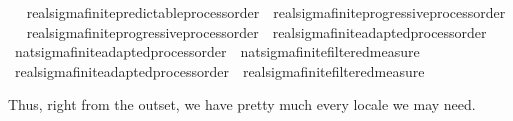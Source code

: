 \begin{isabellebody}
%
\endisatagproof
{\isafoldproof}%
%
\isadelimproof
%
\endisadelimproof
\ \isanewline
\isanewline
{}\isamarkupfalse%
\ real{\isacharunderscore}{\kern0pt}sigma{\isacharunderscore}{\kern0pt}finite{\isacharunderscore}{\kern0pt}predictable{\isacharunderscore}{\kern0pt}process{\isacharunderscore}{\kern0pt}order\ {\isasymsubseteq}\ real{\isacharunderscore}{\kern0pt}sigma{\isacharunderscore}{\kern0pt}finite{\isacharunderscore}{\kern0pt}progressive{\isacharunderscore}{\kern0pt}process{\isacharunderscore}{\kern0pt}order%
\isadelimproof
\ %
\endisadelimproof
%
\isatagproof
\isacommand{{\isachardot}{\kern0pt}{\isachardot}{\kern0pt}}\isamarkupfalse%
%
\endisatagproof
{\isafoldproof}%
%
\isadelimproof
%
\endisadelimproof
\isanewline
{}\isamarkupfalse%
\ real{\isacharunderscore}{\kern0pt}sigma{\isacharunderscore}{\kern0pt}finite{\isacharunderscore}{\kern0pt}progressive{\isacharunderscore}{\kern0pt}process{\isacharunderscore}{\kern0pt}order\ {\isasymsubseteq}\ real{\isacharunderscore}{\kern0pt}sigma{\isacharunderscore}{\kern0pt}finite{\isacharunderscore}{\kern0pt}adapted{\isacharunderscore}{\kern0pt}process{\isacharunderscore}{\kern0pt}order%
\isadelimproof
\ %
\endisadelimproof
%
\isatagproof
\isacommand{{\isachardot}{\kern0pt}{\isachardot}{\kern0pt}}\isamarkupfalse%
%
\endisatagproof
{\isafoldproof}%
%
\isadelimproof
%
\endisadelimproof
\isanewline
\isanewline
{}\isamarkupfalse%
\ nat{\isacharunderscore}{\kern0pt}sigma{\isacharunderscore}{\kern0pt}finite{\isacharunderscore}{\kern0pt}adapted{\isacharunderscore}{\kern0pt}process{\isacharunderscore}{\kern0pt}order\ {\isasymsubseteq}\ nat{\isacharunderscore}{\kern0pt}sigma{\isacharunderscore}{\kern0pt}finite{\isacharunderscore}{\kern0pt}filtered{\isacharunderscore}{\kern0pt}measure%
\isadelimproof
\ %
\endisadelimproof
%
\isatagproof
\isacommand{{\isachardot}{\kern0pt}{\isachardot}{\kern0pt}}\isamarkupfalse%
%
\endisatagproof
{\isafoldproof}%
%
\isadelimproof
%
\endisadelimproof
\isanewline
{}\isamarkupfalse%
\ real{\isacharunderscore}{\kern0pt}sigma{\isacharunderscore}{\kern0pt}finite{\isacharunderscore}{\kern0pt}adapted{\isacharunderscore}{\kern0pt}process{\isacharunderscore}{\kern0pt}order\ {\isasymsubseteq}\ real{\isacharunderscore}{\kern0pt}sigma{\isacharunderscore}{\kern0pt}finite{\isacharunderscore}{\kern0pt}filtered{\isacharunderscore}{\kern0pt}measure%
\isadelimproof
\ %
\endisadelimproof
%
\isatagproof
\isacommand{{\isachardot}{\kern0pt}{\isachardot}{\kern0pt}}\isamarkupfalse%
%
\endisatagproof
{\isafoldproof}%
%
\isadelimproof
%
\endisadelimproof
%
\begin{isamarkuptext}%
Thus, right from the outset, we have pretty much every locale we may need.%
\end{isamarkuptext}\isamarkuptrue%
%
\isadelimtheory
%
\endisadelimtheory
%
\isatagtheory
{}\isamarkupfalse%
%
\endisatagtheory
{\isafoldtheory}%
%
\isadelimtheory
%
\endisadelimtheory
%
\end{isabellebody}%
